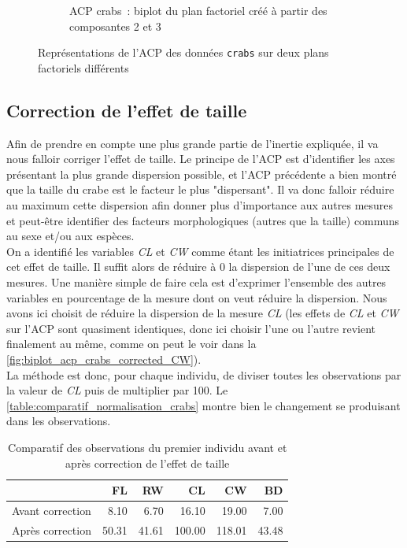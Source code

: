 \documentclass[a4paper,10pt]{report}
\begin{document}
\begin{figure}[H]
\begin{subfigure}[b]{0.5\linewidth}
		\caption{\scriptsize ACP crabs~: biplot du plan factoriel créé à partir des composantes 2 et 3}
		\label{fig:biplot_acp_crabs_plan_2_3}
	\end{subfigure}%
	\caption{
		\small Représentations de l'ACP des données \texttt{crabs} sur deux plans factoriels différents
	}
	\label{fig:biplots_crabs}%
\end{figure}



\subsection{Correction de l'effet de taille}

Afin de prendre en compte une plus grande partie de l'inertie expliquée, il va nous falloir corriger l'effet de taille. Le principe de l'ACP est d'identifier les axes présentant la plus grande dispersion possible, et l'ACP précédente a bien montré que la taille du crabe est le facteur le plus "dispersant". Il va donc falloir réduire au maximum cette dispersion afin donner plus d'importance aux autres mesures et peut-être identifier des facteurs morphologiques (autres que la taille) communs au sexe et/ou aux espèces.\\
On a identifié les variables \textit{CL} et \textit{CW} comme étant les initiatrices principales de cet effet de taille. Il suffit alors de réduire à 0 la dispersion de l'une de ces deux mesures. Une manière simple de faire cela est d'exprimer l'ensemble des autres variables en pourcentage de la mesure dont on veut réduire la dispersion. Nous avons ici choisit de réduire la dispersion de la mesure \textit{CL} (les effets de \textit{CL} et \textit{CW} sur l'ACP sont quasiment identiques, donc ici choisir l'une ou l'autre revient finalement au même, comme on peut le voir dans la \autoref{fig:biplot_acp_crabs_corrected_CW}).\\
La méthode est donc, pour chaque individu, de diviser toutes les observations par la valeur de \textit{CL} puis de multiplier par 100. Le \autoref{table:comparatif_normalisation_crabs} montre bien le changement se produisant dans les observations.

\begin{table}[H]
	\centering
	\captionsetup{justification=centering, margin=4cm}
	\caption{\scriptsize Comparatif des observations du premier individu avant et après correction de l'effet de taille}
	\label{table:comparatif_normalisation_crabs}
	\begin{tabular}{r|rrrrr}
		& FL & RW & CL & CW & BD \\ 
		\hline
		Avant correction & 8.10 & 6.70 & 16.10 & 19.00 & 7.00 \\ 
		Après correction & 50.31 & 41.61 & 100.00 & 118.01 & 43.48 \\ 
	\end{tabular}
\end{table}
\end{document}
